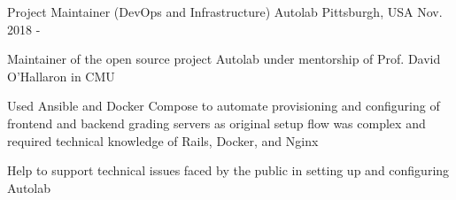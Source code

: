 

\begin{cventries}

  \cventry
  {Project Maintainer (DevOps and Infrastructure)} %
    {Autolab} %
    {Pittsburgh, USA} %
    {Nov. 2018 -} %
    {
      \begin{cvitems} %
      \item {Maintainer of the open source project Autolab under mentorship of Prof. David O'Hallaron in CMU}
      \item {Used Ansible and Docker Compose to automate provisioning and configuring of frontend and backend grading servers as original setup flow was complex and required technical knowledge of Rails, Docker, and Nginx}
      \item {Help to support technical issues faced by the public in setting up and configuring Autolab}
      \end{cvitems}
    }


\end{cventries}

